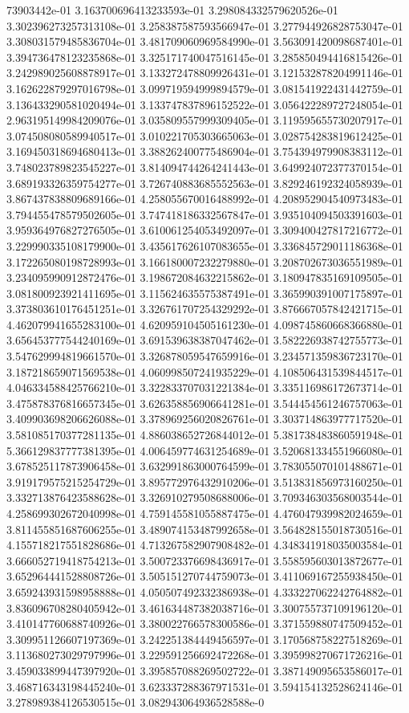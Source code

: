 73903442e-01	3.163700696413233593e-01	3.298084332579620526e-01	3.302396273257313108e-01	3.258387587593566947e-01	3.277944926828753047e-01	3.308031579485836704e-01	3.481709060969584990e-01	3.563091420098687401e-01	3.394736478123235868e-01	3.325171740047516145e-01	3.285850494416815426e-01	3.242989025608878917e-01	3.133272478809926431e-01	3.121532878204991146e-01	3.162622879297016798e-01	3.099719594999894579e-01	3.081541922431442759e-01	3.136433290581020494e-01	3.133747837896152522e-01	3.056422289727248054e-01	2.963195149984209076e-01	3.035809557999309405e-01	3.119595655730207917e-01	3.074508080589940517e-01	3.010221705303665063e-01	3.028754283819612425e-01	3.169450318694680413e-01	3.388262400775486904e-01	3.754394979908383112e-01	3.748023789823545227e-01	3.814094744264241443e-01	3.649924072377370154e-01	3.689193326359754277e-01	3.726740883685552563e-01	3.829246192324058939e-01	3.867437838809689166e-01	4.258055670016488992e-01	4.208952904540973483e-01	3.794455478579502605e-01	3.747418186332567847e-01	3.935104094503391603e-01	3.959364976827276505e-01	3.610061254053492097e-01	3.309400427817216772e-01	3.229990335108179900e-01	3.435617626107083655e-01	3.336845729011186368e-01	3.172265080198728993e-01	3.166180007232279880e-01	3.208702673036551989e-01	3.234095990912872476e-01	3.198672084632215862e-01	3.180947835169109505e-01	3.081800923921411695e-01	3.115624635575387491e-01	3.365990391007175897e-01	3.373803610176451251e-01	3.326761707254329292e-01	3.876667057842421715e-01	4.462079941655283100e-01	4.620959104505161230e-01	4.098745860668366880e-01	3.656453777544240169e-01	3.691539638387047462e-01	3.582226938742755773e-01	3.547629994819661570e-01	3.326878059547659916e-01	3.234571359836723170e-01	3.187218659071569538e-01	4.060998507241935229e-01	4.108506431539844517e-01	4.046334588425766210e-01	3.322833707031221384e-01	3.335116986172673714e-01	3.475878376816657345e-01	3.626358856906641281e-01	3.544454561246757063e-01	3.409903698206626088e-01	3.378969256020826761e-01	3.303714863977717520e-01	3.581085170377281135e-01	4.886038652726844012e-01	5.381738483860591948e-01	5.366129837777381395e-01	4.006459774631254689e-01	3.520681334551966080e-01	3.678525117873906458e-01	3.632991863000764599e-01	3.783055070101488671e-01	3.919179575215254729e-01	3.895772976432910206e-01	3.513831856973160250e-01	3.332713876423588628e-01	3.326910279508688006e-01	3.709346303568003544e-01	4.258699302672040998e-01	4.759145581055887475e-01	4.476047939982024659e-01	3.811455851687606255e-01	3.489074153487992658e-01	3.564828155018730516e-01	4.155718217551828686e-01	4.713267582907908482e-01	4.348341918035003584e-01	3.666052719418754213e-01	3.500723376698436917e-01	3.558595603013872677e-01	3.652964441528808726e-01	3.505151270744759073e-01	3.411069167255938450e-01	3.659243931598958888e-01	4.050507492332386938e-01	4.333227062242764882e-01	3.836096708280405942e-01	3.461634487382038716e-01	3.300755737109196120e-01	3.410147760688740926e-01	3.380022766578300586e-01	3.371559880747509452e-01	3.309951126607197369e-01	3.242251384449456597e-01	3.170568758227518269e-01	3.113680273029797996e-01	3.229591256692472268e-01	3.395998270671726216e-01	3.459033899447397920e-01	3.395857088269502722e-01	3.387149095653586017e-01	3.468716343198445240e-01	3.623337288367971531e-01	3.594154132528624146e-01	3.278989384126530515e-01	3.082943064936528588e-0